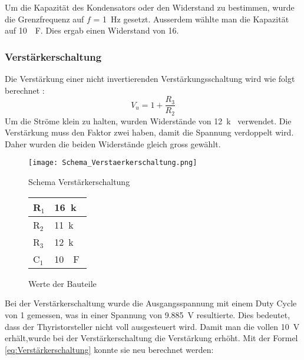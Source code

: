 Um die Kapazität des Kondensators oder den Widerstand zu bestimmen, wurde die Grenzfrequenz auf $f$ = \SI{1}{Hz} gesetzt. Ausserdem wählte man die Kapazität auf \SI{10}{\mu F}. Dies ergab einen Widerstand von \SI{16}{\Omega}. 




\subsubsection*{Verstärkerschaltung}
Die Verstärkung einer nicht invertierenden Verstärkungsschaltung wird wie folgt berechnet \cite{Verstaerker}:
\begin{equation}\label{eq:Verstärkerschaltung}
V_u = 1 + \frac{R_3}{R_2}
\end{equation}
Um die Ströme klein zu halten, wurden Widerstände von \SI{12}{k\Omega} verwendet. Die Verstärkung muss den Faktor zwei haben, damit die Spannung verdoppelt wird. Daher wurden die beiden Widerstände gleich gross gewählt.


\newpage
\begin{figure}[ht!]  
	\centering 
	\begin{minipage}[t]{.76\textwidth} \centering 
		\centering
		\texttt{[image: Schema\_Verstaerkerschaltung.png]}	
		\caption{Schema Verstärkerschaltung}\label{fig:Verstaerkerschaltung}
	\end{minipage}	
	\begin{minipage}[b]{.23\textwidth}
		\centering
		\begin{tabular}{|l|l|}
			\hline
			R$_1$ & \SI{16}{k\Omega} 	\\ 	\hline
			R$_2$ & \SI{11}{k\Omega} 	\\ 	\hline
			R$_3$ & \SI{12}{k\Omega} 	\\	\hline
			C$_1$ & \SI{10}{\mu F} 		\\	\hline
		\end{tabular}
		\caption{Werte der Bauteile}
		\label{tab:Verstaerkerschaltung}
	\end{minipage}
\end{figure} 



Bei der Verstärkerschaltung wurde die Ausgangsspannung mit einem Duty Cycle von 1 gemessen, was in einer Spannung von \SI{9.885}{V} resultierte. Dies bedeutet, dass der Thyristorsteller nicht voll ausgesteuert wird. Damit man die vollen \SI{10}{V} erhält,wurde bei der Verstärkerschaltung die Verstärkung erhöht. Mit der Formel \ref{eq:Verstärkerschaltung} konnte sie neu berechnet werden:

